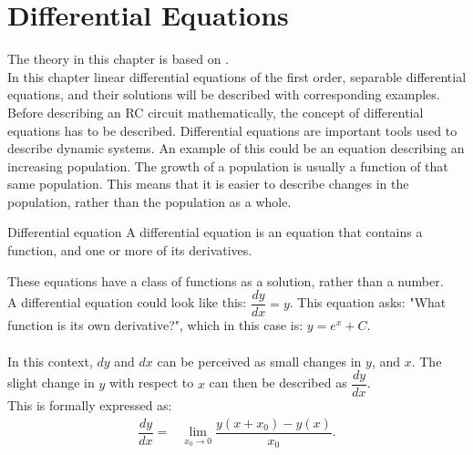 \chapter{Differential Equations} 
The theory in this chapter is based on \cite{diffandcomplex}.\\ In this chapter linear differential equations of the first order, separable differential equations, and their solutions will be described with corresponding examples. \\

\noindent Before describing an RC circuit mathematically, the concept of differential equations has to be described. Differential equations are important tools used to describe dynamic systems. An example of this could be an equation describing an increasing population. The growth of a population is usually a function of that same population. This means that it is easier to describe changes in the population, rather than the population as a whole. \\


\begin{definition}{Differential equation}{}
A differential equation is an equation that contains a function, and one or more of its derivatives.
\end{definition}
\noindent%
These equations have a class of functions as a solution, rather than a number. 
\\
A differential equation could look like this: $\dfrac{dy}{dx} = y$. This equation asks: "What function is its own derivative?", which in this case is: $y=e^x+C$.
\\\\
In this context, $dy$ and $dx$ can be perceived as small changes in $y$, and $x$. The slight change in $y$ with respect to $x$ can then be described as $\dfrac{dy}{dx}$.
\\
This is formally expressed as:
\\
\begin{align*}
	\dfrac{dy}{dx} =& \lim_{x_0\to 0} \dfrac{y(x+x_0)-y(x)}{x_0}.
\end{align*}

